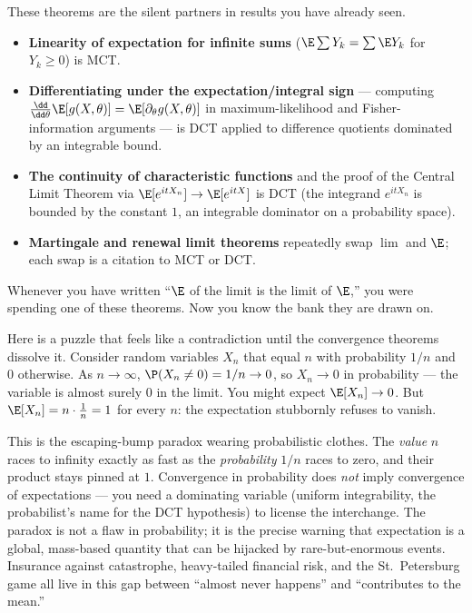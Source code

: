 \begin{aestheticbox}
These theorems are the silent partners in results you have already seen.
\begin{itemize}
\item \textbf{Linearity of expectation for infinite sums}
  ($\E\sum Y_k = \sum \E Y_k$ for $Y_k\ge0$) is MCT.
\item \textbf{Differentiating under the expectation/integral sign}
  --- computing $\frac{\dd}{\dd\theta}\E[g(X,\theta)] = \E[\partial_\theta
  g(X,\theta)]$ in maximum-likelihood and Fisher-information arguments --- is
  DCT applied to difference quotients dominated by an integrable bound.
\item \textbf{The continuity of characteristic functions} and the proof of the
  Central Limit Theorem via $\E[e^{itX_n}]\to\E[e^{itX}]$ is DCT (the
  integrand $e^{itX_n}$ is bounded by the constant $1$, an integrable dominator
  on a probability space).
\item \textbf{Martingale and renewal limit theorems} repeatedly swap $\lim$ and
  $\E$; each swap is a citation to MCT or DCT.
\end{itemize}
Whenever you have written ``$\E$ of the limit is the limit of $\E$,'' you were
spending one of these theorems. Now you know the bank they are drawn on.
\end{aestheticbox}

\begin{paradoxbox}
Here is a puzzle that feels like a contradiction until the convergence theorems
dissolve it. Consider random variables $X_n$ that equal $n$ with probability
$1/n$ and $0$ otherwise. As $n\to\infty$, $\P(X_n\ne 0)=1/n\to 0$, so $X_n\to 0$
in probability --- the variable is almost surely $0$ in the limit. You might
expect $\E[X_n]\to 0$. But $\E[X_n]=n\cdot\frac1n = 1$ for every $n$: the
expectation stubbornly refuses to vanish.

This is the escaping-bump paradox wearing probabilistic clothes. The
\emph{value} $n$ races to infinity exactly as fast as the \emph{probability}
$1/n$ races to zero, and their product stays pinned at $1$. Convergence in
probability does \emph{not} imply convergence of expectations --- you need a
dominating variable (uniform integrability, the probabilist's name for the DCT
hypothesis) to license the interchange. The paradox is not a flaw in
probability; it is the precise warning that expectation is a global, mass-based
quantity that can be hijacked by rare-but-enormous events. Insurance against
catastrophe, heavy-tailed financial risk, and the St.\ Petersburg game all live
in this gap between ``almost never happens'' and ``contributes to the mean.''
\end{paradoxbox}

